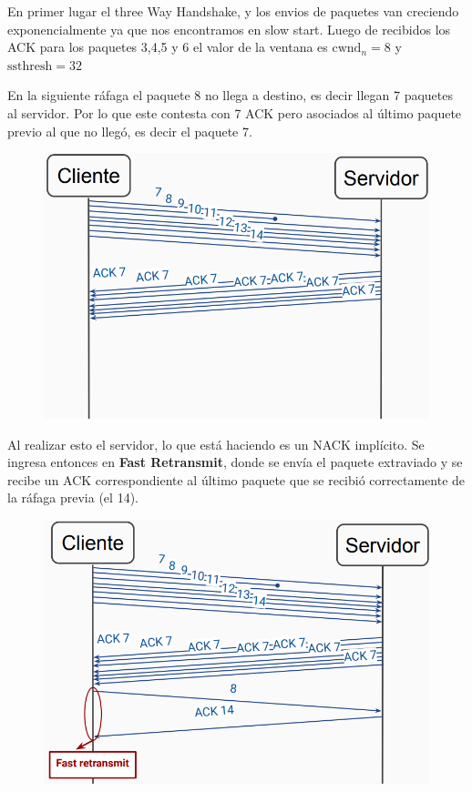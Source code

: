 \documentclass[titlepage,a4paper]{article}
\begin{document}
En primer lugar el three Way Handshake, y los envios de paquetes van creciendo exponencialmente ya que nos encontramos en slow start. Luego de recibidos los ACK para los paquetes 3,4,5 y 6 el valor de la ventana es $\mathrm{cwnd}_n = 8$ y $\mathrm{ssthresh}  = 32$

En la siguiente ráfaga el paquete 8 no llega a destino, es decir llegan 7 paquetes al servidor. Por lo que este contesta con 7 ACK pero asociados al último paquete previo al que no llegó, es decir el paquete 7.

\begin{figure}[H]
\centering
\includegraphics[width=\textwidth]{imagenes/paqEnRafaga.png}
\end{figure}


Al realizar esto el servidor, lo que está haciendo es un NACK implícito. Se ingresa entonces en \textbf{Fast Retransmit}, donde se envía el paquete extraviado y se recibe un ACK correspondiente al último paquete que se recibió correctamente de la ráfaga previa (el 14).


\begin{figure}[H]
\centering
\includegraphics[width=\textwidth]{imagenes/fastRetransmit.png}
\end{figure}
\end{document}

